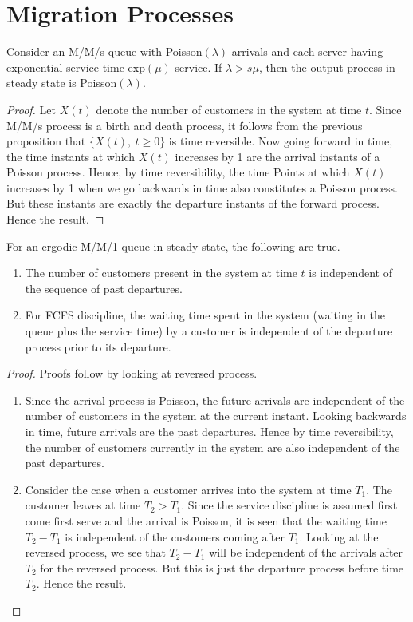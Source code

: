 \documentclass[a4paper,10pt,english]{article}
\begin{document}
\section{Migration Processes}

\begin{cor}
Consider an M/M/s queue with Poisson$(\lambda)$ arrivals and each server having exponential service time exp$(\mu)$ service. If $\lambda > s \mu$, then the output process in steady state is Poisson$(\lambda)$.
\end{cor}
\begin{proof}
Let $X(t)$ denote the number of customers in the system at time $t$. Since M/M/s process is a birth and death process, it follows from the previous proposition that $\{X(t),~t \geq 0\}$ is time reversible. Now going forward in time, the time instants at which $X(t)$ increases by 1 are the arrival instants of a Poisson process. Hence, by time reversibility, the time Points at which $X(t)$ increases by 1 when we go backwards in time also constitutes a Poisson process. But these instants are exactly the departure instants of the forward process. Hence the result.
\end{proof}
\begin{lem}
For an ergodic M/M/1 queue in steady state, the following are true.
\begin{enumerate}
\item The number of customers present in the system at time $t$ is independent of the sequence of past departures.
\item For FCFS discipline, the waiting time spent in the system (waiting in the queue plus the service time) by a customer is independent of the departure process prior to its departure.
\end{enumerate} 
\end{lem} 
\begin{proof}
Proofs follow by looking at reversed process.
\begin{enumerate}
\item Since the arrival process is Poisson, the future arrivals are independent of the number of customers in the system at the current instant. Looking backwards in time, future arrivals are the past departures. Hence by time reversibility, the number of customers currently in the system are also independent of the past departures.
\item Consider the case when a customer arrives into the system at time $T_1$. The customer leaves at time $T_2>T_1$.  Since the service discipline is assumed first come first serve and the arrival is Poisson, it is seen that the waiting time $T_2-T_1$ is independent of the customers coming after $T_1$. Looking at the reversed process, we see that $T_2-T_1$  will be independent of the arrivals after $T_2$ for the reversed process. But this is just the departure process before time $T_2$. Hence the result.
\end{enumerate}
\end{proof}
\end{document}
